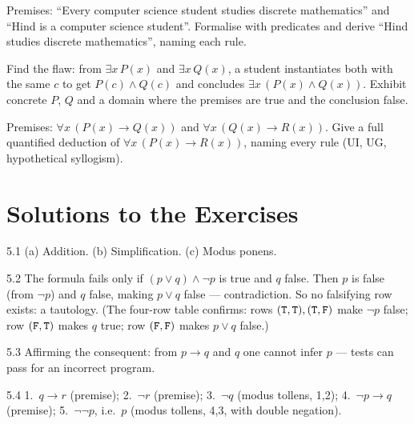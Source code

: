 \begin{exercise}{\medium}
Premises: ``Every computer science student studies discrete mathematics''
and ``Hind is a computer science student''. Formalise with predicates and
derive ``Hind studies discrete mathematics'', naming each rule.
\end{exercise}

\begin{exercise}{\hard}
Find the flaw: from $\exists x\,P(x)$ and $\exists x\,Q(x)$, a student
instantiates both with the same $c$ to get $P(c) \wedge Q(c)$ and concludes
$\exists x\,(P(x) \wedge Q(x))$. Exhibit concrete $P$, $Q$ and a domain where
the premises are true and the conclusion false.
\end{exercise}

\begin{exercise}{\hard}
Premises: $\forall x\,(P(x) \to Q(x))$ and $\forall x\,(Q(x) \to R(x))$.
Give a full quantified deduction of $\forall x\,(P(x) \to R(x))$, naming
every rule (UI, UG, hypothetical syllogism).
\end{exercise}

\section*{Solutions to the Exercises}

\begin{solution}{5.1}
(a) Addition. (b) Simplification. (c) Modus ponens.
\end{solution}

\begin{solution}{5.2}
The formula fails only if $(p \vee q) \wedge \neg p$ is true and $q$ false.
Then $p$ is false (from $\neg p$) and $q$ false, making $p \vee q$ false ---
contradiction. So no falsifying row exists: a tautology. (The four-row table
confirms: rows $(\mathtt{T},\mathtt{T}),(\mathtt{T},\mathtt{F})$ make $\neg p$ false; row $(\mathtt{F},\mathtt{T})$
makes $q$ true; row $(\mathtt{F},\mathtt{F})$ makes $p \vee q$ false.)
\end{solution}

\begin{solution}{5.3}
Affirming the consequent: from $p \to q$ and $q$ one cannot infer $p$ ---
tests can pass for an incorrect program.
\end{solution}

\begin{solution}{5.4}
1.~$q \to r$ (premise); 2.~$\neg r$ (premise); 3.~$\neg q$ (modus tollens,
1,2); 4.~$\neg p \to q$ (premise); 5.~$\neg\neg p$, i.e.\ $p$ (modus tollens,
4,3, with double negation).
\end{solution}

